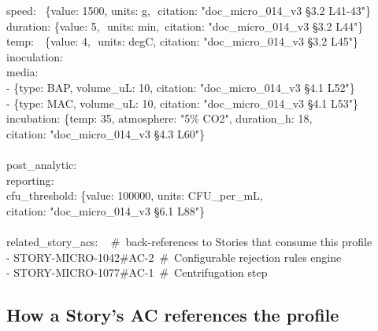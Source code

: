\documentclass[10pt,letterpaper]{article}
\begin{document}
{\hspace*{2em}speed:\,\,\,\,\,\{value: 1500, units: g,\,\,\,\,citation: "doc\_micro\_014\_v3 \S 3.2 L41-43"\}\\
\hspace*{2em}duration: \{value: 5,\,\,\,\,units: min,\,\,\,citation: "doc\_micro\_014\_v3 \S 3.2 L44"\}\\
\hspace*{2em}temp:\,\,\,\,\,\,\{value: 4,\,\,\,\,units: degC,\,\,citation: "doc\_micro\_014\_v3 \S 3.2 L45"\}\\
\hspace*{1em}inoculation:\\
\hspace*{2em}media:\\
\hspace*{3em}- \{type: BAP, volume\_uL: 10, citation: "doc\_micro\_014\_v3 \S 4.1 L52"\}\\
\hspace*{3em}- \{type: MAC, volume\_uL: 10, citation: "doc\_micro\_014\_v3 \S 4.1 L53"\}\\
\hspace*{2em}incubation: \{temp: 35, atmosphere: "5\% CO2", duration\_h: 18,\\
\hspace*{4em}citation: "doc\_micro\_014\_v3 \S 4.3 L60"\}\\
\\
post\_analytic:\\
\hspace*{1em}reporting:\\
\hspace*{2em}cfu\_threshold: \{value: 100000, units: CFU\_per\_mL,\\
\hspace*{4em}citation: "doc\_micro\_014\_v3 \S 6.1 L88"\}\\
\\
related\_story\_acs:\,\,\,\,\,\,\,\#\, back-references to Stories that consume this profile\\
\hspace*{1em}- STORY-MICRO-1042\#AC-2\,\,\,\#\, Configurable rejection rules engine\\
\hspace*{1em}- STORY-MICRO-1077\#AC-1\,\,\,\#\, Centrifugation step}

\subsection{How a Story's AC references the profile}
\end{document}
